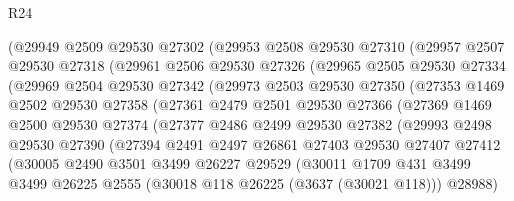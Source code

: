 \begin{lexlean}{R24}
\begin{coremodule}
          (@29949
            @2509
            @29530
            @27302
            (@29953
              @2508
              @29530
              @27310
              (@29957
                @2507
                @29530
                @27318
                (@29961
                  @2506
                  @29530
                  @27326
                  (@29965
                    @2505
                    @29530
                    @27334
                    (@29969
                      @2504
                      @29530
                      @27342
                      (@29973
                        @2503
                        @29530
                        @27350
                        (@27353
                          @1469
                          @2502
                          @29530
                          @27358
                          (@27361
                            @2479
                            @2501
                            @29530
                            @27366
                            (@27369
                              @1469
                              @2500
                              @29530
                              @27374
                              (@27377
                                @2486
                                @2499
                                @29530
                                @27382
                                (@29993
                                  @2498
                                  @29530
                                  @27390
                                  (@27394
                                    @2491
                                    @2497
                                    @26861
                                    @27403
                                    @29530
                                    @27407
                                    @27412
                                    (@30005
                                      @2490
                                      @3501
                                      @3499
                                      @26227
                                      @29529
                                      (@30011
                                        @1709
                                        @431
                                        @3499
                                        @3499
                                        @26225
                                        @2555
                                        (@30018 @118 @26225 (@3637 (@30021 @118)))
                                        @28988)

\end{coremodule}
\end{lexlean}
